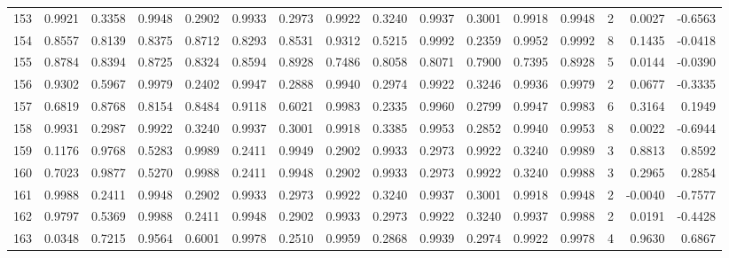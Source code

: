 \begin{tabular}{lrrrrrrrrrrrrrrr}
153 &      0.9921 &  0.3358 &  0.9948 &  0.2902 &  0.9933 &  0.2973 &  0.9922 &  0.3240 &  0.9937 &  0.3001 &   0.9918 &     0.9948 &      2 &                    0.0027 &                    -0.6563 \\
154 &      0.8557 &  0.8139 &  0.8375 &  0.8712 &  0.8293 &  0.8531 &  0.9312 &  0.5215 &  0.9992 &  0.2359 &   0.9952 &     0.9992 &      8 &                    0.1435 &                    -0.0418 \\
155 &      0.8784 &  0.8394 &  0.8725 &  0.8324 &  0.8594 &  0.8928 &  0.7486 &  0.8058 &  0.8071 &  0.7900 &   0.7395 &     0.8928 &      5 &                    0.0144 &                    -0.0390 \\
156 &      0.9302 &  0.5967 &  0.9979 &  0.2402 &  0.9947 &  0.2888 &  0.9940 &  0.2974 &  0.9922 &  0.3246 &   0.9936 &     0.9979 &      2 &                    0.0677 &                    -0.3335 \\
157 &      0.6819 &  0.8768 &  0.8154 &  0.8484 &  0.9118 &  0.6021 &  0.9983 &  0.2335 &  0.9960 &  0.2799 &   0.9947 &     0.9983 &      6 &                    0.3164 &                     0.1949 \\
158 &      0.9931 &  0.2987 &  0.9922 &  0.3240 &  0.9937 &  0.3001 &  0.9918 &  0.3385 &  0.9953 &  0.2852 &   0.9940 &     0.9953 &      8 &                    0.0022 &                    -0.6944 \\
159 &      0.1176 &  0.9768 &  0.5283 &  0.9989 &  0.2411 &  0.9949 &  0.2902 &  0.9933 &  0.2973 &  0.9922 &   0.3240 &     0.9989 &      3 &                    0.8813 &                     0.8592 \\
160 &      0.7023 &  0.9877 &  0.5270 &  0.9988 &  0.2411 &  0.9948 &  0.2902 &  0.9933 &  0.2973 &  0.9922 &   0.3240 &     0.9988 &      3 &                    0.2965 &                     0.2854 \\
161 &      0.9988 &  0.2411 &  0.9948 &  0.2902 &  0.9933 &  0.2973 &  0.9922 &  0.3240 &  0.9937 &  0.3001 &   0.9918 &     0.9948 &      2 &                   -0.0040 &                    -0.7577 \\
162 &      0.9797 &  0.5369 &  0.9988 &  0.2411 &  0.9948 &  0.2902 &  0.9933 &  0.2973 &  0.9922 &  0.3240 &   0.9937 &     0.9988 &      2 &                    0.0191 &                    -0.4428 \\
163 &      0.0348 &  0.7215 &  0.9564 &  0.6001 &  0.9978 &  0.2510 &  0.9959 &  0.2868 &  0.9939 &  0.2974 &   0.9922 &     0.9978 &      4 &                    0.9630 &                     0.6867 \\

\end{tabular}
